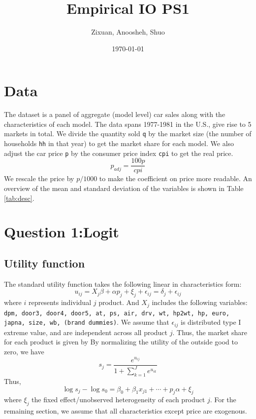 \documentclass[12pt]{article}
\title{Empirical IO PS1}
\author{Zixuan, Anoosheh, Shuo}
\date{\today}
\begin{document}
\maketitle
\thispagestyle{empty}


\section{Data}
The dataset is a panel of aggregate (model level) car sales along with the
characteristics of each model. The data spans 1977-1981 in the U.S., give rise
to 5 markets in total. We divide the quantity sold \verb|q| by the market size
(the number of households \verb|hh| in that year) to get the market share for
each model. We also adjust the car price \verb|p| by the consumer price index
\verb|cpi| to get the real price.
\begin{equation*}
    p_{adj} = \frac{100 p}{cpi}
\end{equation*}
We rescale the price by $p/1000$ to make the coefficient on price more readable.
An overview of the mean and standard deviation of the variables is shown in Table \ref{tab:desc}.


\section{Question 1:Logit}
\subsection{Utility function}
The standard utility function takes the following linear in characteristics
form:
\begin{equation}
    u_{ij}=X_{j}\beta + \alpha p_{j} + \xi_{j}+ \epsilon_{ij}=\delta_j+\epsilon_{ij}
\end{equation}
where $i$ represents individual $j$ product. And $X_{j}$ includes the following variables:\\
\verb|dpm, door3, door4, door5, at, ps, air, drv, wt, hp2wt, hp, euro, japna, size, wb, (brand dummies)|.
We assume that $\epsilon_{ij}$ is distributed type I extreme value, and are independent across all product $j$. Thus, the market share for each product is given by
By normalizing the utility of the outside good to zero, we have
\begin{equation*}
    s_j=\frac{e^{u_{ij}}}{1+\sum_{k=1}^{J}e^{u_{ik}}}
\end{equation*}
Thus,
\begin{equation}\label{eq:logit}
    \log s_j-\log s_0=\beta_0+\beta_1x_{j1}+\cdots+p_j\alpha+\xi_j
\end{equation}
where $\xi_j$ the fixed effect/unobserved heterogeneity of each product $j$.
For the remaining section, we assume that all characteristics except price are exogenous.
\end{document}
